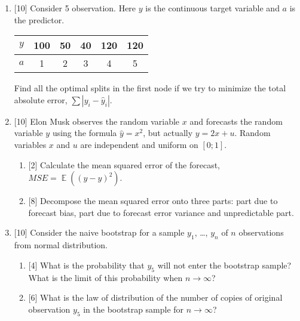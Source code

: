 \documentclass[12pt]{article}
\DeclareMathOperator{\E}{\mathbb{E}}
\begin{document}
\begin{enumerate}
\item {[10]}   Consider 5 observation. Here $y$ is the continuous target variable and $a$ is the predictor.
    
\begin{tabular}{cccccc}
    \toprule
    $y$ & 100 & 50 & 40 & 120 & 120 \\
    \midrule
    $a$ & 1 & 2 & 3 & 4 & 5 \\
    \bottomrule
\end{tabular}

Find all the optimal splits in the first node if we try to minimize the total absolute error, $\sum |y_i - \hat y_i|$.




\item {[10]} Elon Musk observes the random variable $x$ and forecasts the random variable $y$ using the formula $\hat y =  x^2$, but actually $y = 2 x + u$.
Random variables $x$ and $u$ are independent and uniform on $[0;1]$.

\begin{enumerate}
    \item {[2]} Calculate the mean squared error of the forecast, $MSE = \E((y - \hat y)^2 )$.
    \item {[8]} Decompose the mean squared error onto three parts: part due to forecast bias, part due to forecast error variance and unpredictable part. 
\end{enumerate}


\item {[10]} Consider the naive bootstrap for a sample $y_1$, \dots, $y_n$ of $n$ observations from normal distribution.

\begin{enumerate}
    \item {[4]} What is the probability that $y_5$ will not enter the bootstrap sample? What is the limit of this probability
    when $n \to \infty$?
    \item {[6]} What is the law of distribution of the number of copies of original observation $y_5$ in the bootstrap sample for $n\to \infty$?
\end{enumerate}



\end{enumerate}
\end{document}
